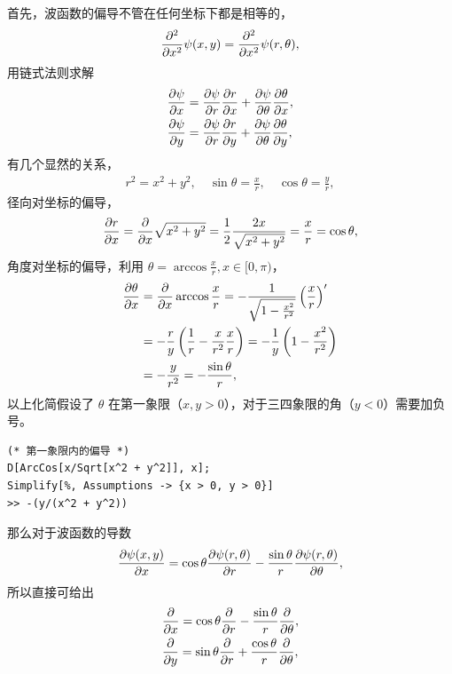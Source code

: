 首先，波函数的偏导不管在任何坐标下都是相等的，
\begin{align}
    \pdv[2]x \psi(x,y) = \pdv[2]{x} \psi(r,\theta),
\end{align}
用链式法则求解
\begin{align}
    &\pdv{\psi}{x} = \pdv{\psi}{r} \pdv{r}{x} + \pdv{\psi}{\theta} \pdv{\theta}{x},\\
    &\pdv{\psi}{y} = \pdv{\psi}{r} \pdv{r}{y} + \pdv{\psi}{\theta} \pdv{\theta}{y},
\end{align}
有几个显然的关系，
\begin{align}
    r^2 = x^2 + y^2, \quad \sin \theta = \frac xr,\quad \cos\theta = \frac yr,
\end{align}
径向对坐标的偏导，
\begin{align}
    \pdv{r}{x} = \pdv{x} \sqrt{x^2 + y^2} = \frac 12 \frac{2x}{\sqrt{x^2 + y^2}} = \frac xr = \cos\theta,
\end{align}
角度对坐标的偏导，利用 $\theta = \arccos \frac xr, x\in[0,\pi)$，
\begin{align}
    \pdv{\theta}{x} &= \pdv{x} \arccos \frac xr = -\frac1{\sqrt{1- \frac{x^2}{r^2}}} \left(\frac xr\right)^{\prime} \\
    &= -\frac ry \left(\frac 1r - \frac x{r^2} \frac xr\right) 
    = -\frac 1y \left(1 - \frac{x^2}{r^2}\right) \\
    &= -\frac{y}{r^2} = - \frac{\sin\theta} r, 
\end{align}
以上化简假设了 $\theta$ 在第一象限（$x,y>0$），对于三四象限的角（$y < 0$）需要加负号。
\begin{lstlisting}
(* 第一象限内的偏导 *)
D[ArcCos[x/Sqrt[x^2 + y^2]], x];
Simplify[%, Assumptions -> {x > 0, y > 0}]
>> -(y/(x^2 + y^2))
\end{lstlisting}

那么对于波函数的导数
\begin{align}
    \pdv{\psi(x,y)}{x} = \cos\theta \pdv{\psi(r,\theta)}{r} - \frac{\sin\theta} r \pdv{\psi(r,\theta)}{\theta}, 
\end{align}
所以直接可给出
\begin{align}
    & \pdv{x} = \cos\theta \pdv{r} - \frac{\sin\theta}r \pdv{\theta},\\
    & \pdv{y} = \sin\theta \pdv{r} + \frac{\cos\theta}{r} \pdv{\theta},
\end{align}

